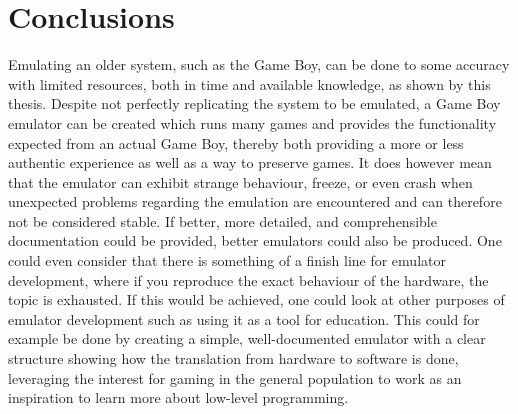 \chapter{Conclusions}
Emulating an older system, such as the Game Boy, can be done to some accuracy with limited resources, both in time and available knowledge, as shown by this thesis. Despite not perfectly replicating the system to be emulated, a Game Boy emulator can be created which runs many games and provides the functionality expected from an actual Game Boy, thereby both providing a more or less authentic experience as well as a way to preserve games. It does however mean that the emulator can exhibit strange behaviour, freeze, or even crash when unexpected problems regarding the emulation are encountered and can therefore not be considered stable. If better, more detailed, and comprehensible documentation could be provided, better emulators could also be produced. One could even consider that there is something of a finish line for emulator development, where if you reproduce the exact behaviour of the hardware, the topic is exhausted. If this would be achieved, one could look at other purposes of emulator development such as using it as a tool for education. This could for example be done by creating a simple, well-documented emulator with a clear structure showing how the translation from hardware to software is done, leveraging the interest for gaming in the general population to work as an inspiration to learn more about low-level programming.